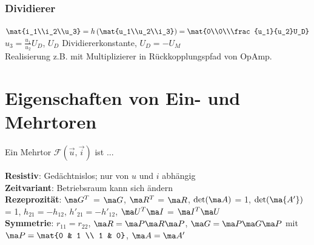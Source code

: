 \documentclass[fs, footer]{latex4ei}
\begin{document}
\begin{multicols*}{4}
	\subsubsection{Dividierer}
	$\mat{i_1\\i_2\\u_3} = h\left(\mat{u_1\\u_2\\i_3}\right) = \mat{0\\0\\\frac{u_1}{u_2}U_D}$\quad$u_3=\frac{u_1}{u_2}U_D$, $U_D$ Dividiererkonstante, $U_D = -U_M$\\
	Realisierung z.B. mit Multiplizierer in Rückkopplungspfad von OpAmp.
\section{Eigenschaften von Ein- und Mehrtoren}
Ein Mehrtor $\mathcal F(\vec u, \vec i)$ ist ...

	\textbf{Resistiv}: Gedächtnislos; nur von $u$ und $i$ abhängig\\
	\textbf{Zeitvariant}: Betriebsraum kann sich ändern\\
	\textbf{Rezeprozität}: $\ma G^T$ = $\ma G$, $\ma R^T$ = $\ma R$, $\det (\ma A)$ = 1, $\det (\ma {A'})$ = 1, $h_{21} = -h_{12}$, $h'_{21} = -h'_{12}$, $\ma U^T\ma I$ = $\ma I^T\ma U$\\
	\textbf{Symmetrie}: $r_{11} = r_{22}$, $\ma R = \ma P\ma R\ma P$, $\ma G = \ma P \ma G \ma P$ mit $\ma P = \mat{0 & 1 \\ 1 & 0}$, $\ma A = \ma A'$



\end{multicols*}
\end{document}
